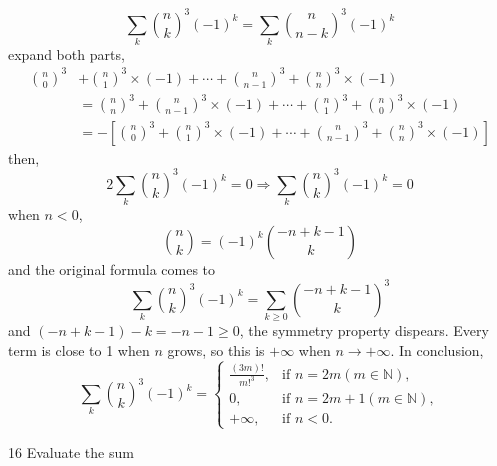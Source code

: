 \documentclass[a4paper,12pt]{article}
\makeatletter
\newtheorem*{solution}{Solution}
\theoremstyle{definition}
\renewenvironment{solution}[1][Solution] {\par\pushQED{\qed}\normalfont\topsep6\p@\@plus6\p@\relax\trivlist\item[\hskip\labelsep\bfseries#1\@addpunct{.}]\ignorespaces}{\popQED\endtrivlist\@endpefalse} \makeatother
\newenvironment{problems}{\begin{list}{}{\renewcommand{\makelabel}[1]{\textbf{##1}\hfil}}}{\end{list}}
\makeatother
\begin{document}
\begin{problems}
\begin{solution}
\begin{equation*}
        \sum_k\binom{n}{k}^3(-1)^k = \sum_k\binom{n}{n-k}^3(-1)^k
       \end{equation*}
       expand both parts,
       \begin{align*}
           \binom{n}{0}^3 &+ \binom{n}{1}^3\times (-1) + \cdots + \binom{n}{n-1}^3 + \binom{n}{n}^3\times(-1) \\
           &= \binom{n}{n}^3  + \binom{n}{n-1}^3\times (-1) + \cdots + \binom{n}{1}^3+ \binom{n}{0}^3\times(-1)\\
           &= -\left[\binom{n}{0}^3 + \binom{n}{1}^3\times (-1) + \cdots + \binom{n}{n-1}^3 + \binom{n}{n}^3\times(-1)\right]
       \end{align*}
       then,
       \begin{equation*}
       2 \sum_k\binom{n}{k}^3(-1)^k = 0 \Rightarrow \sum_k\binom{n}{k}^3(-1)^k = 0 
       \end{equation*}
       when $n<0$,
       \begin{equation*}
           \binom{n}{k} = (-1)^k \binom{-n+k-1}{k}
       \end{equation*}
       and the original formula comes to 
       \begin{equation*}
        \sum_k\binom{n}{k}^3(-1)^k = \sum_{k\geq 0} \binom{-n+k-1}{k}^3
       \end{equation*}
       and $(-n+k-1)-k=-n-1\geq 0$, the symmetry property dispears. Every term is close to 1 when $n$ grows, so this is $+\infty$ when $n\rightarrow +\infty$.
        In conclusion,
        \begin{equation*}
            \sum_k\binom{n}{k}^3(-1)^k = \begin{cases}
                \frac{(3m)!}{m!^3},&\text{if }n=2m(m\in\mathbb{N}),\\
                0,&\text{if }n=2m+1(m\in\mathbb{N}),\\
                +\infty,&\text{if }n<0.
            \end{cases}
        \end{equation*}
    \end{solution}
   \item[16]Evaluate the sum

\end{problems}
\end{document}
